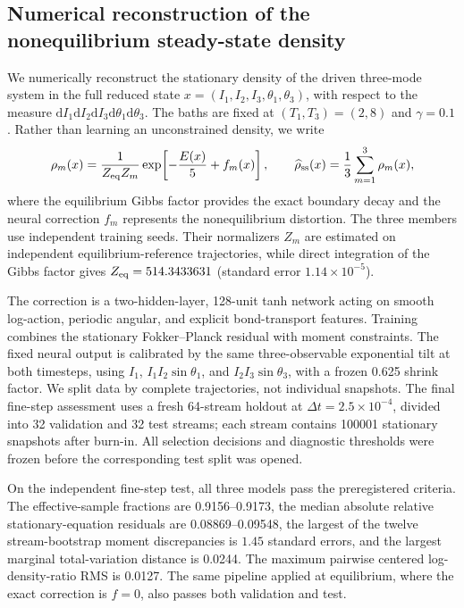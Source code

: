\subsection{Numerical reconstruction of the nonequilibrium steady-state density}
\label{sec:three_mode_ness_density}

We numerically reconstruct the stationary density of the driven three-mode
system in the full reduced state
\(x=(I_1,I_2,I_3,\theta_1,\theta_3)\), with respect to the measure
\(\mathrm dI_1\mathrm dI_2\mathrm dI_3\mathrm d\theta_1\mathrm d\theta_3\).
The baths are fixed at \((T_1,T_3)=(2,8)\) and \(\gamma=0.1\).  Rather than
learning an unconstrained density, we write
\begin{equation}
 \rho_m(x)=\frac{1}{Z_{\rm eq}Z_m}
 \exp\!\left[-\frac{E(x)}{5}+f_m(x)\right],
 \qquad
 \widehat\rho_{\rm ss}(x)=\frac{1}{3}\sum_{m=1}^{3}\rho_m(x),
 \label{eq:ness_density_ratio}
\end{equation}
where the equilibrium Gibbs factor provides the exact boundary decay and the
neural correction \(f_m\) represents the nonequilibrium distortion.  The three
members use independent training seeds.  Their normalizers \(Z_m\) are
estimated on independent equilibrium-reference trajectories, while direct
integration of the Gibbs factor gives
\(Z_{\rm eq}=514.3433631\) (standard error \(1.14\times10^{-5}\)).

The correction is a two-hidden-layer, 128-unit tanh network acting on smooth
log-action, periodic angular, and explicit bond-transport features.  Training
combines the stationary Fokker--Planck residual with moment constraints.  The
fixed neural output is calibrated by the same three-observable exponential
tilt at both timesteps, using \(I_1\), \(I_1I_2\sin\theta_1\), and
\(I_2I_3\sin\theta_3\), with a frozen 0.625 shrink factor.  We
split data by complete trajectories, not individual snapshots.  The final
fine-step assessment uses a fresh 64-stream holdout at
\(\Delta t=2.5\times10^{-4}\), divided into 32 validation and 32 test streams;
each stream contains 100001 stationary snapshots after burn-in.  All selection
decisions and diagnostic thresholds were frozen before the corresponding test
split was opened.

On the independent fine-step test, all three models pass the preregistered
criteria.  The effective-sample fractions are 0.9156--0.9173, the median
absolute relative stationary-equation residuals are 0.08869--0.09548, the
largest of the twelve stream-bootstrap moment discrepancies is
\(1.45\) standard errors, and the largest marginal total-variation distance is
0.0244.  The maximum pairwise centered log-density-ratio RMS is 0.0127.  The
same pipeline applied at equilibrium, where the exact correction is
\(f=0\), also passes both validation and test.

